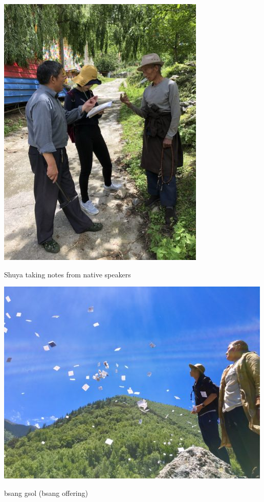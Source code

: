 \documentclass[
  a4paper,
  14pt,
  oneside,
  tablecaptionabove
]{scrbook}
\begin{document}
\leavevmode\hypertarget{attachment_2139}{}%
\includegraphics[width=3.90625in,height=5.20833in]{images/IMG_2558-375x500.jpg}

Shuya taking notes from native speakers

\leavevmode\hypertarget{attachment_2131}{}%
\includegraphics[width=5.20833in,height=3.90625in]{images/IMG_7418-500x375.jpg}

bsang gsol (bsang offering)
\end{document}
